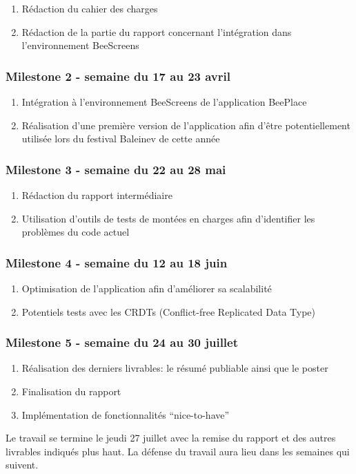 \begin{enumerate}
  \item Rédaction du cahier des charges
  \item Rédaction de la partie du rapport concernant l'intégration dans l'environnement BeeScreens
\end{enumerate}

\subsubsection{Milestone 2 - semaine du 17 au 23 avril}

\begin{enumerate}
  \item Intégration à l'environnement BeeScreens de l'application BeePlace
  \item Réalisation d'une première version de l'application afin d'être potentiellement utilisée lors du festival Baleinev de cette année
\end{enumerate}

\subsubsection{Milestone 3 - semaine du 22 au 28 mai}
\label{milestone3}

\begin{enumerate}
  \item Rédaction du rapport intermédiaire
  \item Utilisation d'outils de tests de montées en charges afin d'identifier les problèmes du code actuel
\end{enumerate}

\subsubsection{Milestone 4 - semaine du 12 au 18 juin}

\begin{enumerate}
  \item Optimisation de l'application afin d'améliorer sa scalabilité
  \item Potentiels tests avec les CRDTs (Conflict-free Replicated Data Type)
\end{enumerate}

\subsubsection{Milestone 5 - semaine du 24 au 30 juillet}

\begin{enumerate}
  \item Réalisation des derniers livrables: le résumé publiable ainsi que le poster
  \item Finalisation du rapport
  \item Implémentation de fonctionnalités “nice-to-have”
\end{enumerate}

Le travail se termine le jeudi 27 juillet avec la remise du rapport et des autres livrables indiqués plus haut. La défense du travail aura lieu dans les semaines qui suivent.
